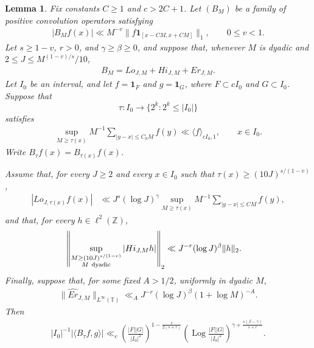 \documentclass[12pt,reqno]{amsart}
\numberwithin{equation}{section}
\newtheorem{lemma}[equation]{Lemma}
\theoremstyle{definition}
\theoremstyle{remark}
\newcommand{\Log}{\operatorname{Log}}
\begin{document}
\begin{lemma}\label{l:localsparse}
Fix constants \(C\geq1\) and \(c>2C+1\).  Let \((B_M)\) be a family
of positive convolution operators satisfying
\begin{align}\label{e:bnv-local}
 |B_M f(x)|
 \ll M^{-v}\|f\mathbf1_{[x-CM,x+CM]}\|_1,
 \qquad 0\leq v<1.
\end{align}
Let \(s\geq1-v\), \(r>0\), and \(\gamma\geq\beta\geq0\), and suppose
that, whenever \(M\) is dyadic and \(2\leq J\leq M^{(1-v)/s}/10\),
\begin{align}\label{e:localdecomposition}
 B_M=Lo_{J,M}+Hi_{J,M}+Er_{J,M}.
\end{align}
Let \(I_0\) be an interval, and let
\(f=\mathbf1_F\) and \(g=\mathbf1_G\), where
\(F\subset cI_0\) and \(G\subset I_0\).  Suppose that
\[
 \tau:I_0\longrightarrow
 \{2^k:2^k\leq|I_0|\}
\]
satisfies
\begin{align}\label{e:admisslocal}
 \sup_{M\geq\tau(x)}M^{-1}
 \sum_{|y-x|\leq C_0M}f(y)
 \ll \langle f\rangle_{cI_0,1},
 \qquad x\in I_0.
\end{align}
Write \(B_\tau f(x)=B_{\tau(x)}f(x)\).

Assume that, for every \(J\geq2\) and every \(x\in I_0\) such that
\(\tau(x)\geq(10J)^{s/(1-v)}\),
\begin{align}
 |Lo_{J,\tau(x)}f(x)|
 &\ll J^s(\log J)^\gamma
 \sup_{M\geq\tau(x)}M^{-1}
 \sum_{|y-x|\leq CM}f(y),
 \label{e:localLow}
\end{align}
and that, for every \(h\in\ell^2(\mathbb Z)\),
\begin{align}
 \left\|
 \sup_{\substack{M\geq(10J)^{s/(1-v)}\\M\ {\rm dyadic}}}
 |Hi_{J,M}h|
 \right\|_2
 &\ll J^{-r}(\log J)^\beta\|h\|_2.
 \label{e:localHigh}
\end{align}
Finally, suppose that, for some fixed \(A>1/2\), uniformly in dyadic \(M\),
\begin{align}
 \|\widehat{Er}_{J,M}\|_{L^\infty(\mathbb T)}
 \ll_A
 J^{-r}(\log J)^\beta(1+\log M)^{-A}.
 \label{e:localError}
\end{align}
Then
\begin{align}\label{e:sparsesquares1}
 |I_0|^{-1}|\langle B_\tau f,g\rangle|
 \ll_c
 \left(\frac{|F||G|}{|I_0|^2}\right)^{
 1-\frac{s}{2(s+r)}}
 \left(\Log\frac{|F||G|}{|I_0|^2}\right)^{
 \gamma+\frac{s(\beta-\gamma)}{s+r}}.
\end{align}
\end{lemma}
\end{document}
